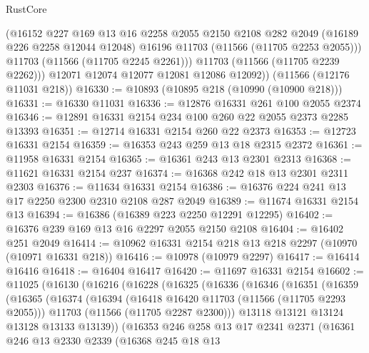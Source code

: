 \begin{lexlean}{RustCore}
\begin{coremodule}
            (@16152
              @227
              @169
              @13
              @16
              @2258
              @2055
              @2150
              @2108
              @282
              @2049
              (@16189 @226 @2258 @12044 @12048)
              @16196
              @11703
              (@11566 (@11705 @2253 @2055)))
            @11703
            (@11566 (@11705 @2245 @2261)))
          @11703
          (@11566 (@11705 @2239 @2262)))
        @12071
        @12074
        @12077
        @12081
        @12086
        @12092))
    (@11566 (@12176 @11031 @218))
@16330 := @10893 (@10895 @218 (@10990 (@10900 @218)))
@16331 := @16330 @11031
@16336 := @12876 @16331 @261 @100 @2055 @2374
@16346 := @12891 @16331 @2154 @234 @100 @260 @22 @2055 @2373 @2285 @13393
@16351 := @12714 @16331 @2154 @260 @22 @2373
@16353 := @12723 @16331 @2154
@16359 := @16353 @243 @259 @13 @18 @2315 @2372
@16361 := @11958 @16331 @2154
@16365 := @16361 @243 @13 @2301 @2313
@16368 := @11621 @16331 @2154 @237
@16374 := @16368 @242 @18 @13 @2301 @2311 @2303
@16376 := @11634 @16331 @2154
@16386 := @16376 @224 @241 @13 @17 @2250 @2300 @2310 @2108 @287 @2049
@16389 := @11674 @16331 @2154 @13
@16394 := @16386 (@16389 @223 @2250 @12291 @12295)
@16402 := @16376 @239 @169 @13 @16 @2297 @2055 @2150 @2108
@16404 := @16402 @251 @2049
@16414 := @10962 @16331 @2154 @218 @13 @218 @2297 (@10970 (@10971 @16331 @218))
@16416 := @10978 (@10979 @2297)
@16417 := @16414 @16416
@16418 := @16404 @16417
@16420 := @11697 @16331 @2154
@16602 := @11025
    (@16130
      (@16216
        (@16228
          (@16325
            (@16336
              (@16346
                (@16351
                  (@16359
                    (@16365
                      (@16374
                        (@16394
                          (@16418 @16420 @11703 (@11566 (@11705 @2293 @2055)))
                          @11703
                          (@11566 (@11705 @2287 @2300)))
                        @13118
                        @13121
                        @13124
                        @13128
                        @13133
                        @13139))
                    (@16353
                      @246
                      @258
                      @13
                      @17
                      @2341
                      @2371
                      (@16361
                        @246
                        @13
                        @2330
                        @2339
                        (@16368
                          @245
                          @18
                          @13

\end{coremodule}
\end{lexlean}
